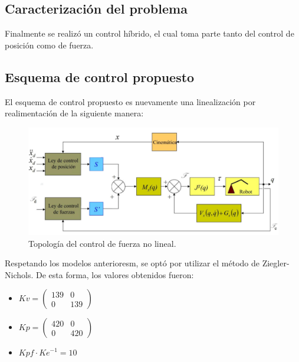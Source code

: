 %

%

\subsection{Caracterización del problema}
Finalmente se realizó un control híbrido, el cual toma parte tanto del control de posición como de fuerza.

\subsection{Esquema de control propuesto}
El esquema de control propuesto es nuevamente una linealización por realimentación de la siguiente manera:
\begin{figure}[H]
	\centering
	\includegraphics[width=0.8\linewidth]{ImagenesControl híbrido no lineal/controlh}
	\caption{Topología del control de fuerza no lineal.}	
	\label{fig:control_f_modelo_h}
\end{figure}


Respetando los modelos anterioresm, se optó por utilizar el método de Ziegler-Nichols. De esta forma, los valores obtenidos fueron:
\begin{multicols}{3}
\begin{itemize}
	\item $Kv = \begin{pmatrix}
	139 & 0 \\
	0 & 139
	\end{pmatrix}$
	\item $Kp = \begin{pmatrix}
	420 & 0 \\
	0 & 420
	\end{pmatrix}$
	\item $Kpf \cdot {Ke}^{-1} = 10$
\end{itemize}
\end{multicols}

